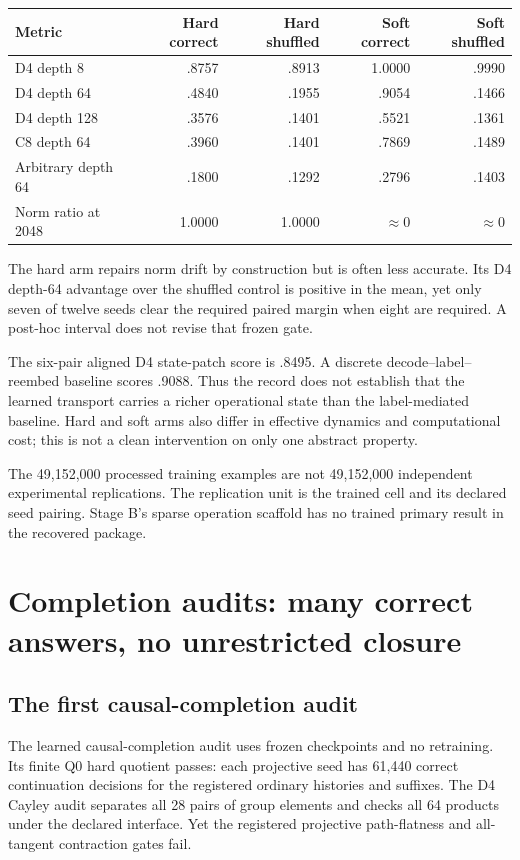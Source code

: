 \documentclass[11pt]{article}
\begin{document}
\begin{center}\begin{tabular}{lrrrr}
\toprule Metric & Hard correct & Hard shuffled & Soft correct & Soft shuffled\\\midrule
D4 depth 8 & .8757 & .8913 & 1.0000 & .9990\\
D4 depth 64 & .4840 & .1955 & .9054 & .1466\\
D4 depth 128 & .3576 & .1401 & .5521 & .1361\\
C8 depth 64 & .3960 & .1401 & .7869 & .1489\\
Arbitrary depth 64 & .1800 & .1292 & .2796 & .1403\\
Norm ratio at 2048 & 1.0000 & 1.0000 & $\approx0$ & $\approx0$\\\bottomrule
\end{tabular}\end{center}
The hard arm repairs norm drift by construction but is often less accurate. Its D4 depth-64 advantage over the shuffled control is positive in the mean, yet only seven of twelve seeds clear the required paired margin when eight are required. A post-hoc interval does not revise that frozen gate.

The six-pair aligned D4 state-patch score is .8495. A discrete decode--label--reembed baseline scores .9088. Thus the record does not establish that the learned transport carries a richer operational state than the label-mediated baseline. Hard and soft arms also differ in effective dynamics and computational cost; this is not a clean intervention on only one abstract property.

The 49,152,000 processed training examples are not 49,152,000 independent experimental replications. The replication unit is the trained cell and its declared seed pairing. Stage B's sparse operation scaffold has no trained primary result in the recovered package.

\section{Completion audits: many correct answers, no unrestricted closure}
\subsection{The first causal-completion audit}
The learned causal-completion audit uses frozen checkpoints and no retraining. Its finite Q0 hard quotient passes: each projective seed has 61,440 correct continuation decisions for the registered ordinary histories and suffixes. The D4 Cayley audit separates all 28 pairs of group elements and checks all 64 products under the declared interface. Yet the registered projective path-flatness and all-tangent contraction gates fail. \cite{ncc}
\end{document}

